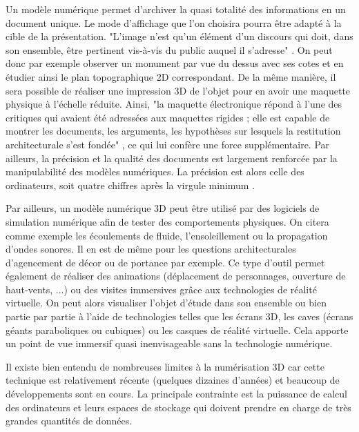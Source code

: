 		Un modèle numérique permet d'archiver la quasi totalité des informations en un document unique. Le mode d'affichage que l'on choisira pourra être adapté à la cible de la présentation. "L’image n’est qu’un élément d’un discours qui doit, dans son ensemble, être pertinent vis-à-vis du public auquel il s’adresse" \cite[p. 20]{golvin}. On peut donc par exemple observer un monument par vue du dessus avec ses cotes et en étudier ainsi le plan topographique 2D correspondant. De la même manière, il sera possible de réaliser une impression 3D de l'objet pour en avoir une maquette physique à l'échelle réduite. Ainsi, "la maquette électronique répond à l’une des critiques qui avaient été adressées aux maquettes rigides ; elle est capable de montrer les documents, les arguments, les hypothèses sur lesquels la restitution architecturale s’est fondée" \cite[p. 26]{golvin}, ce qui lui confère une force supplémentaire. Par ailleurs, la précision et la qualité des documents est largement renforcée par la manipulabilité des modèles numériques. La précision est alors celle des ordinateurs, soit quatre chiffres après la virgule minimum \cite[Tableau : Valeur pour les unités matérielles standard d'arithmétique à virgule flottante]{precisionmachine}. 
		 
		 Par ailleurs, un modèle numérique 3D peut être utilisé par des logiciels de simulation numérique afin de tester des comportements physiques. On citera comme exemple les écoulements de fluide, l'ensoleillement ou la propagation d'ondes sonores. Il en est de même pour les questions architecturales d'agencement de décor ou de portance par exemple. Ce type d'outil permet également de réaliser des animations (déplacement de personnages, ouverture de haut-vents, ...) ou des visites immersives grâce aux technologies de réalité virtuelle. On peut alors visualiser l'objet d'étude dans son ensemble ou bien partie par partie à l'aide de technologies telles que les écrans 3D, les caves (écrans géants paraboliques ou cubiques) ou les casques de réalité virtuelle. Cela apporte un point de vue immersif quasi inenvisageable sans la technologie numérique.
		 
Il existe bien entendu de nombreuses limites à la numérisation 3D car cette technique est relativement récente (quelques dizaines d'années) et beaucoup de développements sont en cours. La principale contrainte est la puissance de calcul des ordinateurs et leurs espaces de stockage qui doivent prendre en charge de très grandes quantités de données.

